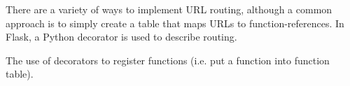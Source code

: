 There are a variety of ways to implement URL routing, although a common approach is to simply create a table that maps URLs to function-references. In Flask, a Python decorator is used to describe routing.

\begin{definition}
	The use of decorators to register functions (i.e. put a function into function table).
\end{definition}